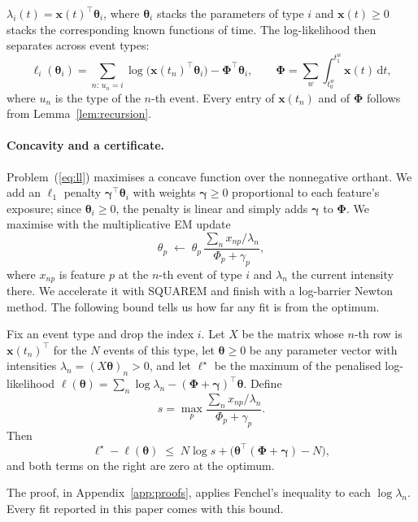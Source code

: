 $\lambda_i(t)=\bm x(t)^\top\bm\theta_i$, where $\bm\theta_i$ stacks the parameters of type $i$ and
$\bm x(t)\ge0$ stacks the corresponding known functions of time. The log-likelihood then
separates across event types:
\begin{equation}\label{eq:ll}
\ell_i(\bm\theta_i)=\sum_{n:\,u_n=i}\log\bigl(\bm x(t_n)^\top\bm\theta_i\bigr)-\bm\Phi^\top\bm\theta_i,
\qquad \bm\Phi=\sum_w\int_{t_0^w}^{t_1^w}\bm x(t)\,\mathrm{d}t ,
\end{equation}
where $u_n$ is the type of the $n$-th event. Every entry of $\bm x(t_n)$ and of $\bm\Phi$ follows
from Lemma~\ref{lem:recursion}.

\paragraph{Concavity and a certificate.} Problem~(\ref{eq:ll}) maximises a concave function over
the nonnegative orthant. We add an $\ell_1$ penalty $\bm\gamma^\top\bm\theta_i$ with weights
$\bm\gamma\ge0$ proportional to each feature's exposure; since $\bm\theta_i\ge0$, the penalty is
linear and simply adds $\bm\gamma$ to $\bm\Phi$. We maximise with the multiplicative EM update
\[
\theta_p\;\leftarrow\;\theta_p\,\frac{\sum_n x_{np}/\lambda_n}{\Phi_p+\gamma_p},
\]
where $x_{np}$ is feature $p$ at the $n$-th event of type $i$ and $\lambda_n$ the current intensity
there. We accelerate it with SQUAREM \citep{varadhan2008simple} and finish with a log-barrier
Newton method. The following bound tells us how far any fit is from the optimum.

\begin{proposition}\label{prop:gap}
Fix an event type and drop the index $i$. Let $X$ be the matrix whose $n$-th row is
$\bm x(t_n)^\top$ for the $N$ events of this type, let $\bm\theta\ge0$ be any parameter vector with
intensities $\lambda_n=(X\bm\theta)_n>0$, and let $\ell^\star$ be the maximum of the penalised
log-likelihood $\ell(\bm\theta)=\sum_n\log\lambda_n-(\bm\Phi+\bm\gamma)^\top\bm\theta$. Define
\[
s=\max_p\frac{\sum_n x_{np}/\lambda_n}{\Phi_p+\gamma_p}.
\]
Then
\[
\ell^\star-\ell(\bm\theta)\;\le\;N\log s+\bigl(\bm\theta^\top(\bm\Phi+\bm\gamma)-N\bigr),
\]
and both terms on the right are zero at the optimum.
\end{proposition}
The proof, in Appendix~\ref{app:proofs}, applies Fenchel's inequality to each $\log\lambda_n$.
Every fit reported in this paper comes with this bound.

